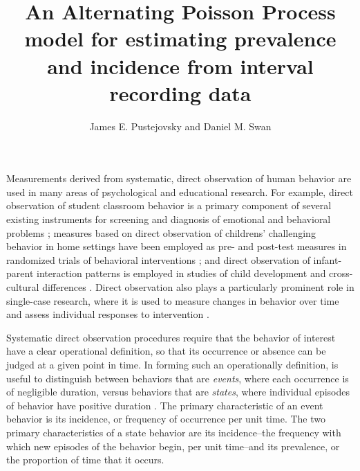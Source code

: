 \documentclass[man, noextraspace, floatsintext]{apa6}\usepackage[]{graphicx}\usepackage[]{color}
\title{An Alternating Poisson Process model for estimating prevalence and incidence from interval recording data}
\author{James E. Pustejovsky and Daniel M. Swan}
\affiliation{The University of Texas at Austin}
\begin{document}
\maketitle

Measurements derived from systematic, direct observation of human behavior are used in many areas of psychological and educational research. For example, direct observation of student classroom behavior is a primary component of several existing instruments for screening and diagnosis of emotional and behavioral problems \citep{Volpe2005observing}; measures based on direct observation of childrens' challenging behavior in home settings have been employed as pre- and post-test measures in randomized trials of behavioral interventions \citep[e.g.,][]{Durand2012positive}; and direct observation of infant-parent interaction patterns is employed in studies of child development \citep{Mann1991time} and cross-cultural differences \citep{Bornstein2002measurement}. Direct observation also plays a particularly prominent role in single-case research, where it is used to measure changes in behavior over time and assess individual responses to intervention \citep{Kazdin2011single}.

Systematic direct observation procedures require that the behavior of interest have a clear operational definition, so that its occurrence or absence can be judged at a given point in time. In forming such an operationally definition, is useful to distinguish between behaviors that are \textit{events}, where each occurrence is of negligible duration, versus behaviors that are \textit{states}, where individual episodes of behavior have positive duration \citep{Altmann1974observational}. The primary characteristic of an event behavior is its incidence, or frequency of occurrence per unit time. The two primary characteristics of a state behavior are its incidence--the frequency with which new episodes of the behavior begin, per unit time--and its prevalence, or the proportion of time that it occurs. 

\end{document}
